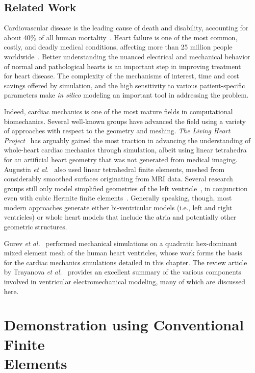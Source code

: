 \subsection{Related Work}
Cardiovascular disease is the leading cause of death and disability, accounting for about 40$\%$ of all human mortality~\cite{genet_2015}. Heart failure is one of the most common, costly, and deadly medical conditions, affecting more than 25 million people worldwide~\cite{mann_2015}. Better understanding the nuanced electrical and mechanical behavior of normal and pathological hearts is an important step in improving treatment for heart disease. The complexity of the mechanisms of interest, time and cost savings offered by simulation, and the high sensitivity to various patient-specific parameters make \textit{in silico} modeling an important tool in addressing the problem.

Indeed, cardiac mechanics is one of the most mature fields in computational biomechanics. Several well-known groups have advanced the field using a variety of approaches with respect to the geometry and meshing. \textit{The Living Heart Project}~\cite{genet_2015, baillargeon_2014} has arguably gained the most traction in advancing the understanding of whole-heart cardiac mechanics through simulation, albeit using linear tetrahedra for an artificial heart geometry that was not generated from medical imaging. Augustin \textit{et al.}~\cite{augustin_2016} also used linear tetrahedral finite elements, meshed from considerably smoothed surfaces originating from MRI data. Several research groups still only model simplified geometries of the left ventricle~\cite{guccione_2005, sack_2016}, in conjunction even with cubic Hermite finite elements~\cite{mcculloch_2000}. Generally speaking, though, most modern approaches generate either bi-ventricular models (i.e., left and right ventricles) or whole heart models that include the atria and potentially other geometric structures.

Gurev \textit{et al.}~\cite{gurev_2015} performed mechanical simulations on a quadratic hex-dominant mixed element mesh of the human heart ventricles, whose work forms the basis for the cardiac mechanics simulations detailed in this chapter. The review article by Trayanova \textit{et al.}~\cite{trayanova_2011} provides an excellent summary of the various components involved in ventricular electromechanical modeling, many of which are discussed here.

\section[Demonstration using Conventional Finite Elements]{Demonstration using Conventional Finite \\ Elements}

